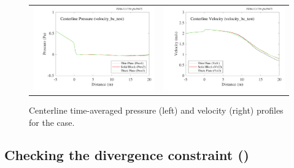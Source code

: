 \documentclass[11pt]{book}
\begin{document}
\begin{figure}[ht]
\begin{tabular*}{\textwidth}{lr}
\includegraphics[width=3.2in]{SCRIPT_FIGURES/velocity_bc_test_pres} &
\includegraphics[width=3.2in]{SCRIPT_FIGURES/velocity_bc_test_vel}
\end{tabular*}
\caption[The  test case]{Centerline time-averaged pressure (left) and velocity (right) profiles for the  case.}
\label{velocity_bc_test}
\end{figure}


\subsection{Checking the divergence constraint (\texorpdfstring{}{divergence\_test})}
\end{document}
